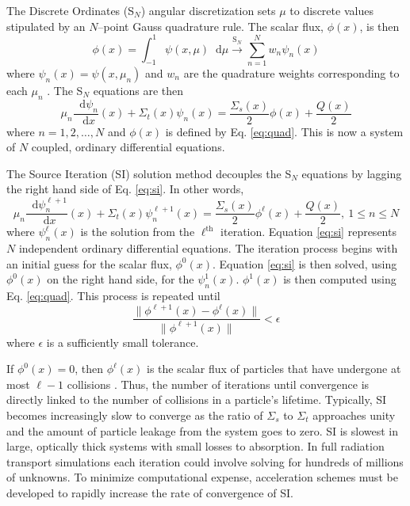 \documentclass{anstrans}
\newcommand{\SN}{S$_N$\xspace}
\newcommand{\ud}{\mathop{}\!\mathrm{d}} %
\newcommand{\dderiv}[2]{\frac{\ud #1}{\ud #2}}
\begin{document}
	The Discrete Ordinates (\SN) angular discretization sets $\mu$ to discrete values stipulated by an $N$--point Gauss quadrature rule. The scalar flux, $\phi(x)$, is then 
		\begin{equation} \label{eq:quad}
			\phi(x) = \int_{-1}^1 \psi(x, \mu) \ud\mu 
				\xrightarrow{\text{S}_N} \sum_{n=1}^N w_n \psi_n(x)
		\end{equation}
	where $\psi_n(x) = \psi(x,\mu_n)$ and $w_n$ are the quadrature weights corresponding to each $\mu_n$ \cite{llnl}. The \SN equations are then 
		\begin{equation} \label{eq:sn}
			\mu_n \dderiv{\psi_n}{x}(x) + \Sigma_t(x) \psi_n(x) = 
			\frac{\Sigma_s(x)}{2} \phi(x) + \frac{Q(x)}{2} 
		\end{equation}
	where $n = 1, 2, \dots, N$ and $\phi(x)$ is defined by Eq. \ref{eq:quad}. This is now a system of $N$ coupled, ordinary differential equations. 

	The Source Iteration (SI) solution method decouples the \SN equations by lagging the right hand side of Eq. \ref{eq:si}. In other words, 
		\begin{equation} \label{eq:si}
			\mu_n \dderiv{\psi_n^{\ell+1}}{x}(x) + \Sigma_t(x) \psi_n^{\ell+1}(x) = 
			\frac{\Sigma_s(x)}{2} \phi^{\ell}(x) + \frac{Q(x)}{2}, \ 1 \leq n \leq N
		\end{equation}
	where $\psi_n^\ell(x)$ is the solution from the $\ell^\text{th}$ iteration. Equation \ref{eq:si} represents $N$ independent ordinary differential equations. The iteration process begins with an initial guess for the scalar flux, $\phi^0(x)$. Equation \ref{eq:si} is then solved, using $\phi^0(x)$ on the right hand side, for the $\psi_n^1(x)$. $\phi^1(x)$ is then computed using Eq. \ref{eq:quad}.  
	This process is repeated until 
		\begin{equation} \label{eq:converg}
			\frac{\|\phi^{\ell+1}(x) - \phi^{\ell}(x)\|}{\|\phi^{\ell+1}(x)\|} < \epsilon
		\end{equation}
	where $\epsilon$ is a sufficiently small tolerance. 

	If $\phi^0(x) = 0$, then $\phi^\ell(x)$ is the scalar flux of particles that have undergone at most $\ell - 1$ collisions \cite{adams}. Thus, the number of iterations until convergence is directly linked to the number of collisions in a particle's lifetime. Typically, SI becomes increasingly slow to converge as the ratio of $\Sigma_s$ to $\Sigma_t$ approaches unity and the amount of particle leakage from the system goes to zero. SI is slowest in large, optically thick systems with small losses to absorption. In full radiation transport simulations each iteration could involve solving for hundreds of millions of unknowns. To minimize computational expense, acceleration schemes must be developed to rapidly increase the rate of convergence of SI. 
\end{document}
